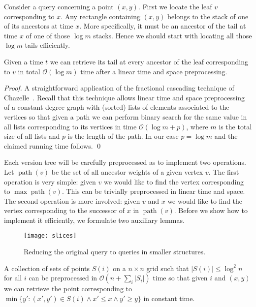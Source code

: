 \documentclass[runningheads]{llncs}
\DeclareMathOperator{\ancestors}{path}
\begin{document}
Consider a query concerning a point $(x,y)$. First we locate the leaf $v$ corresponding to $x$. Any rectangle containing $(x,y)$ belongs to the
stack of one of its ancestors at time $x$. More specifically, it must be an ancestor of the tail at time $x$ of one of those $\log m$ stacks. Hence
we should start with locating all those $\log m$ tails efficiently.

\begin{lemma}\label{lemma:cascading}
Given a time $t$ we can retrieve its tail at every ancestor of the leaf corresponding to $v$ in total $\mathcal{O}(\log m)$ time after a linear time and space preprocessing.
\end{lemma}

\begin{proof}
A straightforward application of the fractional cascading technique of Chazelle~\cite{Chazelle}. Recall that this technique allows linear time and
space preprocessing of a constant-degree graph with (sorted) lists of elements associated to the vertices so that given a path we can perform binary search for the same value in all lists corresponding to its vertices in time $\mathcal{O}(\log m + p)$, where $m$ is the total size of all lists and $p$ is the length of the path. In our case $p=\log m$ and the claimed running time follows.
\qed
\end{proof}

Each version tree will be carefully preprocessed as to implement two operations. Let $\ancestors(v)$ be the set of all ancestor weights of a given vertex $v$. The first operation is very simple: given $v$ we would like to find the vertex corresponding to $\max\ancestors(v)$. This can be trivially preprocessed in linear time and space. The second operation is more involved: given $v$ and $x$ we would like to find the vertex corresponding to the successor of $x$ in $\ancestors(v)$. Before we show how to implement it efficiently, we formulate two auxiliary lemmas.

\begin{figure}
\centering
\texttt{[image: slices]}
\caption{Reducing the original query to queries in smaller structures.}
\label{figure:slices}
\end{figure}

\begin{lemma}\label{lemma:small grid}
A collection of sets of points $S(i)$ on a $n\times n$ grid such that $|S(i)|\leq\log^{2} n$ for all $i$ can be preprocessed in $\mathcal{O}(n+\sum_{i}|S_{i}|)$ time so that given $i$ and $(x,y)$ we can retrieve the point corresponding to $\min\{y' : (x',y')\in S(i)\wedge x'\leq x\wedge y'\geq y \}$ in constant time.
\end{lemma}
\end{document}
